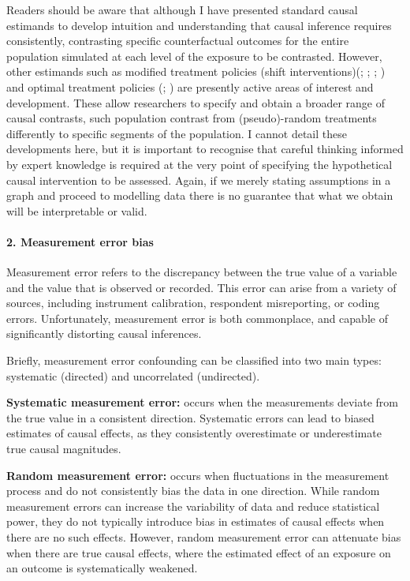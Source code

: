 \documentclass[
  singlecolumn,
  9pt]{article}
\let\oldparagraph\paragraph
\renewcommand{\paragraph}[1]{\oldparagraph{#1}\mbox{}}
\begin{document}
Readers should be aware that although I have presented standard causal
estimands to develop intuition and understanding that causal inference
requires consistently, contrasting specific counterfactual outcomes for
the entire population simulated at each level of the exposure to be
contrasted. However, other estimands such as modified treatment policies
(shift interventions)(; ;
;
) and optimal
treatment policies (;
) are presently
active areas of interest and development. These allow researchers to
specify and obtain a broader range of causal contrasts, such population
contrast from (pseudo)-random treatments differently to specific
segments of the population. I cannot detail these developments here, but
it is important to recognise that careful thinking informed by expert
knowledge is required at the very point of specifying the hypothetical
causal intervention to be assessed. Again, if we merely stating
assumptions in a graph and proceed to modelling data there is no
guarantee that what we obtain will be interpretable or valid.

\paragraph{2. Measurement error bias}\label{measurement-error-bias}

Measurement error refers to the discrepancy between the true value of a
variable and the value that is observed or recorded. This error can
arise from a variety of sources, including instrument calibration,
respondent misreporting, or coding errors. Unfortunately, measurement
error is both commonplace, and capable of significantly distorting
causal inferences.

Briefly, measurement error confounding can be classified into two main
types: systematic (directed) and uncorrelated (undirected).

\textbf{Systematic measurement error:} occurs when the measurements
deviate from the true value in a consistent direction. Systematic errors
can lead to biased estimates of causal effects, as they consistently
overestimate or underestimate true causal magnitudes.

\textbf{Random measurement error:} occurs when fluctuations in the
measurement process and do not consistently bias the data in one
direction. While random measurement errors can increase the variability
of data and reduce statistical power, they do not typically introduce
bias in estimates of causal effects when there are no such effects.
However, random measurement error can attenuate bias when there are true
causal effects, where the estimated effect of an exposure on an outcome
is systematically weakened.
\end{document}
